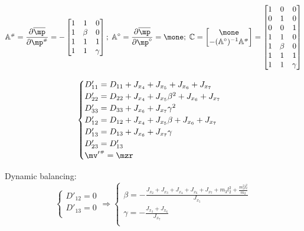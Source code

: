 \documentclass[a4paper,11pt,brazil,fleqn]{article}
\begin{document}
\begin{equation}
\mA\ssh = \frac{\partial \overline{\mp}}{\partial \mp\ssh} = -
\begin{bmatrix}
1 & 1     & 0 \\
1 & \beta & 0 \\
1 & 1     & 1 \\
1 & 1     & \gamma \\
\end{bmatrix}; \;
\mA^\circ = \frac{\partial \overline{\mp}}{\partial \mp^\circ} = \mone; \;
\mC =
\begin{bmatrix}
\mone \\
-(\mA^\circ)^{-1} \mA\ssh
\end{bmatrix}  =
\begin{bmatrix}
1 & 0 & 0 \\
0 & 1 & 0 \\
0 & 0 & 1 \\
1 & 1     & 0 \\
1 & \beta & 0 \\
1 & 1     & 1 \\
1 & 1     & \gamma \\
\end{bmatrix} 
\end{equation}

\begin{equation}
\begin{cases}
D'_{11} = D_{11} + J_{x_4} + J_{x_5} + J_{x_6} + J_{x_7} \\
D'_{22} = D_{22} + J_{x_4} + J_{x_5} \beta^2 + J_{x_6} + J_{x_7} \\
D'_{33} = D_{33} + J_{x_6} + J_{x_7} \gamma^2 \\
D'_{12} = D_{12} + J_{x_4} + J_{x_5} \beta + J_{x_6} + J_{x_7} \\
D'_{13} = D_{13} + J_{x_6} + J_{x_7} \gamma  \\
D'_{23} = D'_{13}\\
{\mv'}\ssh = \mzr \\
\end{cases}
\end{equation}

Dynamic balancing:
\begin{equation}
\begin{cases}
D'_{12} = 0 \\
D'_{13} = 0 \\
\end{cases}
\Rightarrow
\begin{cases}
\beta = -\frac{J_{x_2} + J_{x_3} + J_{x_4} + J_{x_6} + J_{x_7} + m_3 l_2^2 + \frac{m_3^2 l_2^2}{m_2}}{J_{x_5}} \\
\gamma = -\frac{J_{x_3} + J_{x_6}}{J_{x_7}} \\
\end{cases}
\end{equation}
\end{document}
